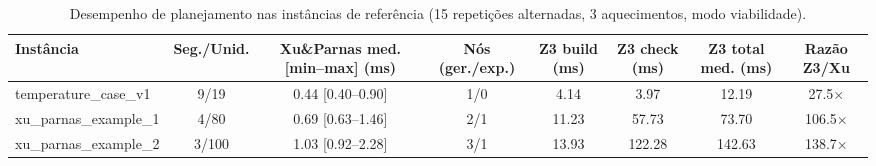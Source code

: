 \begin{table}[t]
\centering
\caption{Desempenho de planejamento nas inst\^ancias de refer\^encia (15 repeti\c{c}\~oes alternadas, 3 aquecimentos, modo viabilidade).}
\label{tab:desempenho_referencia}
\footnotesize
\begin{tabular}{lccccccc}
\hline
\textbf{Inst\^ancia} & \textbf{Seg./Unid.} & \textbf{Xu\&Parnas med. [min--max] (ms)} & \textbf{N\'os (ger./exp.)} & \textbf{Z3 build (ms)} & \textbf{Z3 check (ms)} & \textbf{Z3 total med. (ms)} & \textbf{Raz\~ao Z3/Xu} \\
\hline
temperature\_case\_v1 & 9/19 & 0.44 [0.40--0.90] & 1/0 & 4.14 & 3.97 & 12.19 & 27.5$\times$ \\
xu\_parnas\_example\_1 & 4/80 & 0.69 [0.63--1.46] & 2/1 & 11.23 & 57.73 & 73.70 & 106.5$\times$ \\
xu\_parnas\_example\_2 & 3/100 & 1.03 [0.92--2.28] & 3/1 & 13.93 & 122.28 & 142.63 & 138.7$\times$ \\
\hline
\end{tabular}
\end{table}
